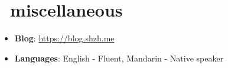 \documentclass{common}
\begin{document}
\section{\faInfo\ miscellaneous}
\begin{itemize}[parsep=0.5ex]
    \item \textbf{Blog}: \href{https://blog.shzh.me}{https://blog.shzh.me}
    \item \textbf{Languages}: English - Fluent, Mandarin - Native speaker
\end{itemize}
\end{document}
